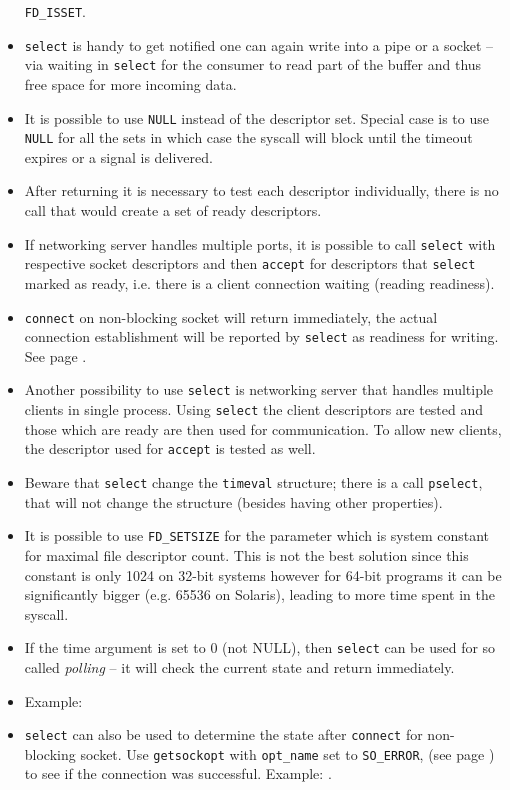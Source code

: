 \begin{itemize}
\texttt{FD\_ISSET}.
\item \texttt{select} is handy to get notified one can again write into a pipe
or a socket -- via waiting in \texttt{select} for the consumer to read part of
the buffer and thus free space for more incoming data.
\item It is possible to use \texttt{NULL} instead of the descriptor set. Special
case is to use \texttt{NULL} for all the sets in which case the syscall will
block until the timeout expires or a signal is delivered.
\item After returning it is necessary to test each descriptor individually,
there is no call that would create a set of ready descriptors.
\item If networking server handles multiple ports, it is possible to call
\texttt{select} with respective socket descriptors and then \texttt{accept}
for descriptors that \texttt{select} marked as ready, i.e. there is a client
connection waiting (reading readiness).
\item \texttt{connect} on non-blocking socket will return immediately, the
actual connection establishment will be reported by \texttt{select} as readiness
for writing. See page \pageref{CONNECT}.
\item Another possibility to use \texttt{select} is networking server that
handles multiple clients in single process. Using \texttt{select} the client
descriptors are tested and those which are ready are then used for
communication. To allow new clients, the descriptor used for \texttt{accept} is
tested as well.
\item Beware that \texttt{select}  change the \texttt{timeval}
structure; there is a call \texttt{pselect}, that will not change the structure
(besides having other properties).
\item It is possible to use \texttt{FD\_SETSIZE} for the 
parameter which is system constant for maximal file descriptor count. This is
not the best solution since this constant is only 1024 on 32-bit systems however
for 64-bit programs it can be significantly bigger (e.g. 65536 on Solaris),
leading to more time spent in the syscall.
\item If the time argument is set to 0 (not NULL), then \texttt{select} can be
used for so called \emph{polling} -- it will check the current state and return
immediately.
\item Example:  
\item \texttt{select} can also be used to determine the state after
\texttt{connect} for non-blocking socket. Use \texttt{getsockopt} with
\texttt{opt\_name} set to \texttt{SO\_ERROR}, (see page \pageref{GETSOCKOPT}) to
see if the connection was successful.
 Example: .


\end{itemize}

